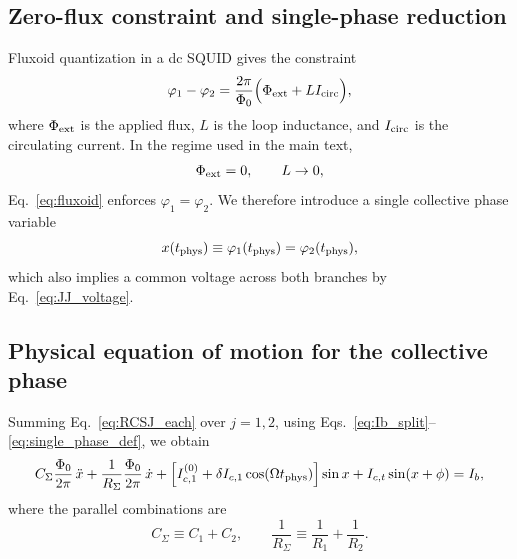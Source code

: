 \documentclass[prl,twocolumn,superscriptaddress,showpacs,nofootinbib]{revtex4-2}
\begin{document}
\subsection{Zero-flux constraint and single-phase reduction}
Fluxoid quantization in a dc SQUID gives the constraint
\begin{equation}
\varphi_1-\varphi_2
= \frac{2\pi}{\Phi_0}\Big(\Phi_{\rm ext}+L I_{\rm circ}\Big),
\label{eq:fluxoid}
\end{equation}
where $\Phi_{\rm ext}$ is the applied flux, $L$ is the loop inductance, and
$I_{\rm circ}$ is the circulating current.
In the regime used in the main text,
\begin{equation}
\Phi_{\rm ext}=0,
\qquad
L\to 0,
\label{eq:zero_flux_small_L}
\end{equation}
Eq.~\eqref{eq:fluxoid} enforces $\varphi_1=\varphi_2$.
We therefore introduce a single collective phase variable
\begin{equation}
x(t_{\rm phys}) \equiv \varphi_1(t_{\rm phys})=\varphi_2(t_{\rm phys}),
\label{eq:single_phase_def}
\end{equation}
which also implies a common voltage across both branches by
Eq.~\eqref{eq:JJ_voltage}.

\subsection{Physical equation of motion for the collective phase}
Summing Eq.~\eqref{eq:RCSJ_each} over $j=1,2$, using
Eqs.~\eqref{eq:Ib_split}--\eqref{eq:single_phase_def}, we obtain
\begin{equation}
C_\Sigma\frac{\Phi_0}{2\pi}\,\ddot x
+\frac{1}{R_\Sigma}\frac{\Phi_0}{2\pi}\,\dot x
+\Big[I_{c,1}^{(0)}+\delta I_{c,1}\cos(\Omega t_{\rm phys})\Big]\sin x
+ I_{c,t}\sin(x+\phi)
= I_b,
\label{eq:phys_EOM}
\end{equation}
where the parallel combinations are
\begin{equation}
C_\Sigma \equiv C_1+C_2,
\qquad
\frac{1}{R_\Sigma}\equiv \frac{1}{R_1}+\frac{1}{R_2}.
\label{eq:Reff_Ceff}
\end{equation}
\end{document}
